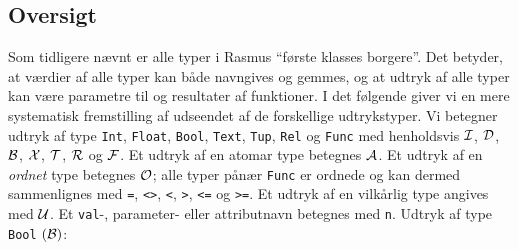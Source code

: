 \subsection{Oversigt}
Som tidligere n\ae{}vnt er alle typer i {\sc Rasmus}
``f\o{}rste klasses borgere''. Det betyder, at v\ae{}rdier af alle typer
kan b\aa{}de navngives og gemmes, og at udtryk af alle typer
kan v\ae{}re parametre til og resultater af funktioner. I det f\o{}lgende
giver vi en mere systematisk fremstilling af udseendet af de forskellige
udtrykstyper. Vi betegner udtryk af type 
\verb"Int", \verb"Float", \verb"Bool", \verb"Text", \verb"Tup", \verb"Rel"
og \verb"Func" med henholdsvis $\cal I$, $\cal D$, $\cal B$, $\cal X$, $\cal T$, 
$\cal R$ og $\cal F$. Et udtryk af en atomar type betegnes $\cal A$.
Et udtryk af en {\em ordnet\/} type betegnes $\cal O$; alle typer
p\aa{}n\ae{}r \verb"Func" er ordnede og kan dermed sammenlignes med
\verb"=", \verb"<>", \verb"<", \verb">", \verb"<=" og \verb">=".
Et udtryk af en vilk\aa{}rlig type angives med $\cal U$.
Et \verb"val"-, parameter- eller
attributnavn betegnes med \verb"n".
\newpage
Udtryk af type \verb"Bool" $(\cal B)$:
